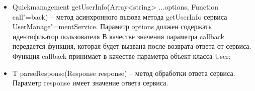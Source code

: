 \begin{itemize}
  \item Quickmanagement getUserInfo(Array<string> ...options, Function call"=back) – метод асинхронного вызова метода getUserInfo сервиса UserManage"=mentService. Параметр options должен содержать идентификатор пользователя В качестве значения параметра callback передается функция, которая будет вызвана после возврата ответа от сервиса. Функция callback принимает в качестве параметра объект класса User;
  \item T parseResponse(Response response) – метод обработки ответа сервиса. Параметр response имеет значение ответа сервиса.
\end{itemize}